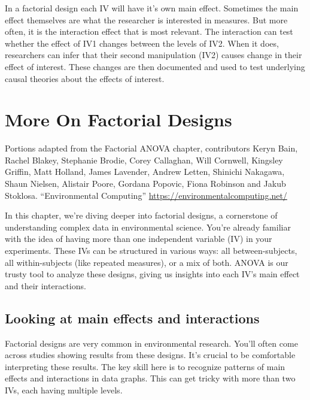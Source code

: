 \documentclass[
  letterpaper,
  DIV=11,
  numbers=noendperiod]{scrreprt}
\begin{document}
In a factorial design each IV will have it's own main effect. Sometimes
the main effect themselves are what the researcher is interested in
measures. But more often, it is the interaction effect that is most
relevant. The interaction can test whether the effect of IV1 changes
between the levels of IV2. When it does, researchers can infer that
their second manipulation (IV2) causes change in their effect of
interest. These changes are then documented and used to test underlying
causal theories about the effects of interest.


\chapter{More On Factorial Designs}\label{more-on-factorial-designs}

Portions adapted from the Factorial ANOVA chapter, contributors Keryn
Bain, Rachel Blakey, Stephanie Brodie, Corey Callaghan, Will Cornwell,
Kingsley Griffin, Matt Holland, James Lavender, Andrew Letten, Shinichi
Nakagawa, Shaun Nielsen, Alistair Poore, Gordana Popovic, Fiona Robinson
and Jakub Stoklosa. ``Environmental Computing''
\url{https://environmentalcomputing.net/}

\hfill\break

In this chapter, we're diving deeper into factorial designs, a
cornerstone of understanding complex data in environmental science.
You're already familiar with the idea of having more than one
independent variable (IV) in your experiments. These IVs can be
structured in various ways: all between-subjects, all within-subjects
(like repeated measures), or a mix of both. ANOVA is our trusty tool to
analyze these designs, giving us insights into each IV's main effect and
their interactions.

\section{Looking at main effects and
interactions}\label{looking-at-main-effects-and-interactions}

Factorial designs are very common in environmental research. You'll
often come across studies showing results from these designs. It's
crucial to be comfortable interpreting these results. The key skill here
is to recognize patterns of main effects and interactions in data
graphs. This can get tricky with more than two IVs, each having multiple
levels.
\end{document}
